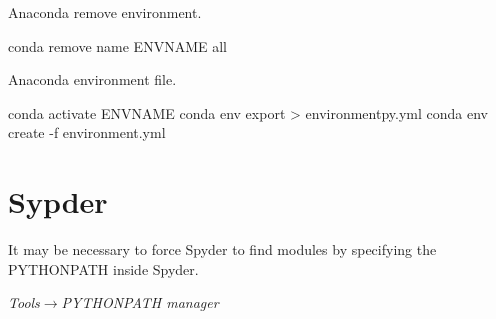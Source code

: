 \begin{numberedlist}
		\item Anaconda remove environment.
		\begin{code}[\codenumbering]{}
			\codeitemnonumber conda remove \switch{}name ENVNAME \switch{}all
		\end{code}

		\item Anaconda environment file.
		\begin{code}[\codenumbering]{}
			\codeitemnonumber conda activate ENVNAME
			\codeitemnonumber conda env export > environmentpy.yml
			\codeitemnonumber conda env create -f environment.yml
		\end{code}
	\end{numberedlist}

	\section{Sypder}
It may be necessary to force Spyder to find modules by specifying the PYTHONPATH inside Spyder.
\begin{plainlist}
	\item \emph{Tools}$\rightarrow$\emph{PYTHONPATH manager}
\end{plainlist}